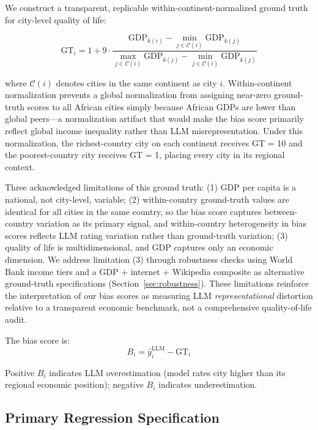 \documentclass[12pt]{article}
\begin{document}
We construct a transparent, replicable within-continent-normalized ground truth for city-level quality of life:

\begin{equation}
\label{eq:gt}
\mathrm{GT}_{i} = 1 + 9 \cdot \frac{\mathrm{GDP}_{k(i)} - \min_{j \in \mathcal{C}(i)}\mathrm{GDP}_{k(j)}}{\max_{j \in \mathcal{C}(i)}\mathrm{GDP}_{k(j)} - \min_{j \in \mathcal{C}(i)}\mathrm{GDP}_{k(j)}}
\end{equation}

where $\mathcal{C}(i)$ denotes cities in the same continent as city $i$. Within-continent normalization prevents a global normalization from assigning near-zero ground-truth scores to all African cities simply because African GDPs are lower than global peers---a normalization artifact that would make the bias score primarily reflect global income inequality rather than LLM misrepresentation. Under this normalization, the richest-country city on each continent receives GT = 10 and the poorest-country city receives GT = 1, placing every city in its regional context.

Three acknowledged limitations of this ground truth: (1) GDP per capita is a national, not city-level, variable; (2) within-country ground-truth values are identical for all cities in the same country, so the bias score captures between-country variation as its primary signal, and within-country heterogeneity in bias scores reflects LLM rating variation rather than ground-truth variation; (3) quality of life is multidimensional, and GDP captures only an economic dimension. We address limitation (3) through robustness checks using World Bank income tiers and a GDP + internet + Wikipedia composite as alternative ground-truth specifications (Section~\ref{sec:robustness}). These limitations reinforce the interpretation of our bias scores as measuring LLM \emph{representational} distortion relative to a transparent economic benchmark, not a comprehensive quality-of-life audit.

The bias score is:
\begin{equation}
\label{eq:bias}
B_i = \hat{y}_i^{\mathrm{LLM}} - \mathrm{GT}_i
\end{equation}

Positive $B_i$ indicates LLM overestimation (model rates city higher than its regional economic position); negative $B_i$ indicates underestimation.

\subsection{Primary Regression Specification}
\end{document}
